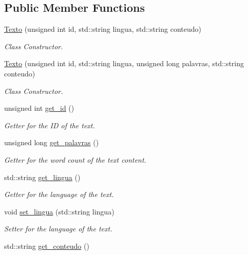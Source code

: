 \subsection*{Public Member Functions}
\begin{DoxyCompactItemize}
\item 
\hyperlink{class_texto_a7034548c1e8e2007b0825ef3a01b1b88}{Texto} (unsigned int id, std\-::string lingua, std\-::string conteudo)
\begin{DoxyCompactList}\small\item\em Class Constructor. \end{DoxyCompactList}\item 
\hyperlink{class_texto_a3ccc9eb8eb980eda5e5f6583cbb60425}{Texto} (unsigned int id, std\-::string lingua, unsigned long palavras, std\-::string conteudo)
\begin{DoxyCompactList}\small\item\em Class Constructor. \end{DoxyCompactList}\item 
unsigned int \hyperlink{class_texto_a4e1b7a020c3b1cffe4518937cdd6f565}{get\-\_\-id} ()
\begin{DoxyCompactList}\small\item\em Getter for the I\-D of the text. \end{DoxyCompactList}\item 
unsigned long \hyperlink{class_texto_a249af46529ab15e98103f1ebe9c3cabb}{get\-\_\-palavras} ()
\begin{DoxyCompactList}\small\item\em Getter for the word count of the text content. \end{DoxyCompactList}\item 
std\-::string \hyperlink{class_texto_adfaca963b37bef9a739def84e2c810b6}{get\-\_\-lingua} ()
\begin{DoxyCompactList}\small\item\em Getter for the language of the text. \end{DoxyCompactList}\item 
void \hyperlink{class_texto_a297021cc2780c0bf398119bf0e4977e0}{set\-\_\-lingua} (std\-::string lingua)
\begin{DoxyCompactList}\small\item\em Setter for the language of the text. \end{DoxyCompactList}\item 
std\-::string \hyperlink{class_texto_a01a9590011195b1a258e2d3bd247ceb0}{get\-\_\-conteudo} ()

\end{DoxyCompactItemize}
